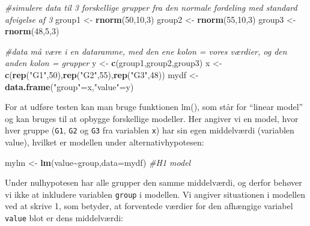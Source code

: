 \documentclass[
]{book}
\newenvironment{Shaded}{\begin{snugshade}}{\end{snugshade}}
\newcommand{\AttributeTok}[1]{\textcolor[rgb]{0.13,0.29,0.53}{#1}}
\newcommand{\CommentTok}[1]{\textcolor[rgb]{0.56,0.35,0.01}{\textit{#1}}}
\newcommand{\DecValTok}[1]{\textcolor[rgb]{0.00,0.00,0.81}{#1}}
\newcommand{\FunctionTok}[1]{\textcolor[rgb]{0.13,0.29,0.53}{\textbf{#1}}}
\newcommand{\NormalTok}[1]{#1}
\newcommand{\OtherTok}[1]{\textcolor[rgb]{0.56,0.35,0.01}{#1}}
\newcommand{\SpecialCharTok}[1]{\textcolor[rgb]{0.81,0.36,0.00}{\textbf{#1}}}
\newcommand{\StringTok}[1]{\textcolor[rgb]{0.31,0.60,0.02}{#1}}
\theoremstyle{definition}
\theoremstyle{definition}
\theoremstyle{definition}
\theoremstyle{definition}
\theoremstyle{remark}
\begin{document}
\begin{Shaded}
\begin{Highlighting}[]
\CommentTok{\#simulere data til 3 forskellige grupper fra den normale fordeling med standard afvigelse af 3}
\NormalTok{group1 }\OtherTok{\textless{}{-}} \FunctionTok{rnorm}\NormalTok{(}\DecValTok{50}\NormalTok{,}\DecValTok{10}\NormalTok{,}\DecValTok{3}\NormalTok{)}
\NormalTok{group2 }\OtherTok{\textless{}{-}} \FunctionTok{rnorm}\NormalTok{(}\DecValTok{55}\NormalTok{,}\DecValTok{10}\NormalTok{,}\DecValTok{3}\NormalTok{)}
\NormalTok{group3 }\OtherTok{\textless{}{-}} \FunctionTok{rnorm}\NormalTok{(}\DecValTok{48}\NormalTok{,}\DecValTok{5}\NormalTok{,}\DecValTok{3}\NormalTok{)}

\CommentTok{\#data må være i en dataramme, med den ene kolon = vores værdier, og den anden kolon = grupper}
\NormalTok{y }\OtherTok{\textless{}{-}} \FunctionTok{c}\NormalTok{(group1,group2,group3)}
\NormalTok{x }\OtherTok{\textless{}{-}} \FunctionTok{c}\NormalTok{(}\FunctionTok{rep}\NormalTok{(}\StringTok{"G1"}\NormalTok{,}\DecValTok{50}\NormalTok{),}\FunctionTok{rep}\NormalTok{(}\StringTok{"G2"}\NormalTok{,}\DecValTok{55}\NormalTok{),}\FunctionTok{rep}\NormalTok{(}\StringTok{"G3"}\NormalTok{,}\DecValTok{48}\NormalTok{))}
\NormalTok{mydf }\OtherTok{\textless{}{-}} \FunctionTok{data.frame}\NormalTok{(}\StringTok{"group"}\OtherTok{=}\NormalTok{x,}\StringTok{"value"}\OtherTok{=}\NormalTok{y)}
\end{Highlighting}
\end{Shaded}

For at udføre testen kan man bruge funktionen lm(), som står for ``linear model'' og kan bruges til at opbygge forskellige modeller. Her angiver vi en model, hvor hver gruppe (\texttt{G1}, \texttt{G2} og \texttt{G3} fra variablen \texttt{x}) har sin egen middelværdi (variablen value), hvilket er modellen under alternativhypotesen:

\begin{Shaded}
\begin{Highlighting}[]
\NormalTok{mylm }\OtherTok{\textless{}{-}} \FunctionTok{lm}\NormalTok{(value}\SpecialCharTok{\textasciitilde{}}\NormalTok{group,}\AttributeTok{data=}\NormalTok{mydf) }\CommentTok{\#H1 model}
\end{Highlighting}
\end{Shaded}

Under nulhypotesen har alle grupper den samme middelværdi, og derfor behøver vi ikke at inkludere variablen \texttt{group} i modellen. Vi angiver situationen i modellen ved at skrive 1, som betyder, at forventede værdier for den afhængige variabel \texttt{value} blot er dens middelværdi:
\end{document}
